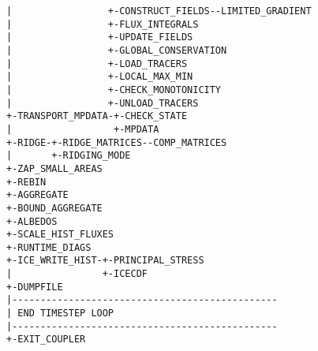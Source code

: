 {\begin{verbatim}
|                 +-CONSTRUCT_FIELDS--LIMITED_GRADIENT
|                 +-FLUX_INTEGRALS
|                 +-UPDATE_FIELDS
|                 +-GLOBAL_CONSERVATION
|                 +-LOAD_TRACERS
|                 +-LOCAL_MAX_MIN
|                 +-CHECK_MONOTONICITY
|                 +-UNLOAD_TRACERS
+-TRANSPORT_MPDATA-+-CHECK_STATE
|                  +-MPDATA
+-RIDGE-+-RIDGE_MATRICES--COMP_MATRICES
|       +-RIDGING_MODE
+-ZAP_SMALL_AREAS
+-REBIN
+-AGGREGATE
+-BOUND_AGGREGATE
+-ALBEDOS
+-SCALE_HIST_FLUXES
+-RUNTIME_DIAGS
+-ICE_WRITE_HIST-+-PRINCIPAL_STRESS
|                +-ICECDF
+-DUMPFILE
|-----------------------------------------------
| END TIMESTEP LOOP
|-----------------------------------------------
+-EXIT_COUPLER
\end{verbatim}
}
